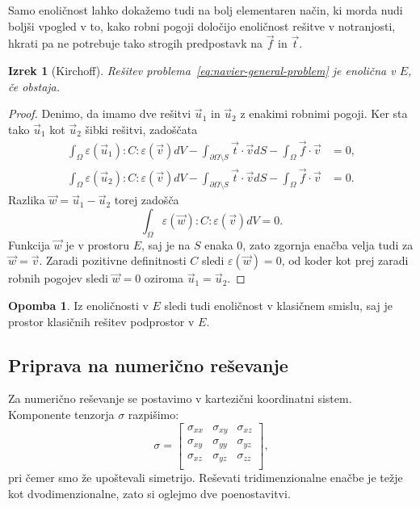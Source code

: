 \documentclass[12pt,a4paper,twoside]{article}
\theoremstyle{definition} %
\newtheorem{opomba}[definicija]{Opomba}
\theoremstyle{plain} %
\newtheorem{izrek}[definicija]{Izrek}
\numberwithin{equation}{section}
\newcommand{\eps}{\varepsilon}
\newcommand{\vv}{\vec{v}}
\newcommand{\vt}{\vec{t}}
\newcommand{\vu}{\vec{u}}
\newcommand{\vw}{\vec{w}}
\newcommand{\vf}{\vec{f}}
\newcommand{\ts}{\sigma}
\begin{document}
Samo enoličnost lahko dokažemo tudi na bolj elementaren način, ki morda nudi boljši
vpogled v to, kako robni pogoji določijo enoličnost rešitve v notranjosti, hkrati pa ne potrebuje
tako strogih predpostavk na $\vf$ in $\vt$.
\begin{izrek}[Kirchoff]
  Rešitev problema~\ref{eq:navier-general-problem} je enolična v
  $E$, če obstaja.
\end{izrek}
\begin{proof}
Denimo, da imamo dve rešitvi $\vu_1$ in $\vu_2$ z enakimi robnimi pogoji.
Ker sta tako $\vu_1$ kot $\vu_2$ šibki rešitvi, zadoščata
\begin{align*}
\int_{\Omega}\eps(\vu_1) : C : \eps(\vv) dV - \int_{\partial \Omega\setminus S} \vt\cdot \vv dS -
\int_{\Omega} \vf\cdot \vv &= 0, \\
\int_{\Omega}\eps(\vu_2) : C : \eps(\vv) dV - \int_{\partial \Omega\setminus S} \vt\cdot \vv dS -
\int_{\Omega} \vf\cdot \vv &= 0.
\end{align*}
Razlika $\vw = \vu_1 - \vu_2$ torej zadošča
\begin{equation*}
  \int_{\Omega}\eps(\vw) : C : \eps(\vv) dV = 0.
\end{equation*}
Funkcija $\vw$ je v prostoru $E$, saj je na $S$ enaka 0, zato zgornja enačba velja tudi za
$\vw = \vv$. Zaradi pozitivne definitnosti $C$ sledi $\eps(\vw) = 0$, od koder kot prej zaradi
robnih pogojev sledi $\vw = 0$ oziroma $\vu_1 = \vu_2$.
\end{proof}
\begin{opomba}
  Iz enoličnosti v $E$ sledi tudi enoličnost v klasičnem smislu, saj je prostor klasičnih rešitev
  podprostor v $E$.
\end{opomba}

\subsection{Priprava na numerično reševanje}
Za numerično reševanje se postavimo v kartezični koordinatni sistem.
Komponente tenzorja $\ts$ razpišimo:
\begin{equation}
  \ts =
  \begin{bmatrix}
    \ts_{xx} & \ts_{xy} & \ts_{xz} \\
    \ts_{xy} & \ts_{yy} & \ts_{yz} \\
    \ts_{xz} & \ts_{yz} & \ts_{zz} \\
  \end{bmatrix},
\end{equation}
pri čemer smo že upoštevali simetrijo. Reševati tridimenzionalne enačbe je težje
kot dvodimenzionalne, zato si oglejmo dve poenostavitvi.
\end{document}
